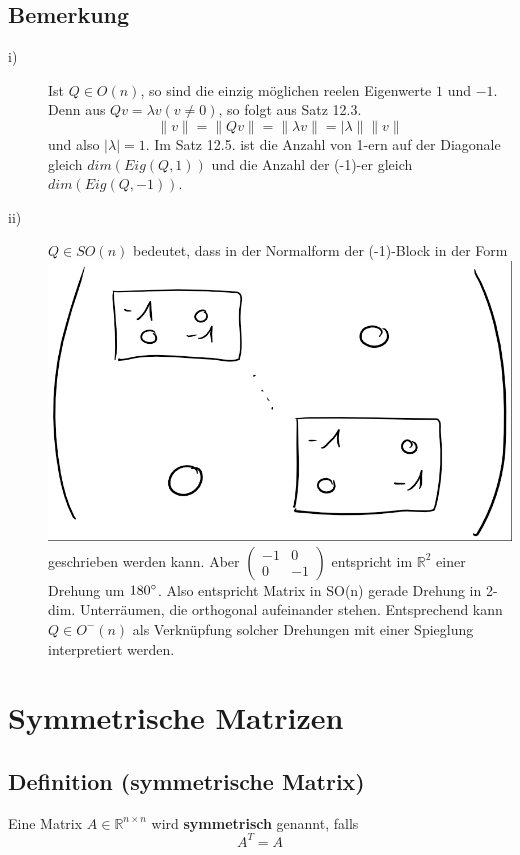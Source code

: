 \documentclass{scrbook}
\begin{document}
\section{Bemerkung}
\begin{description}
\item[i)]Ist $Q \in O(n)$, so sind die einzig möglichen reelen Eigenwerte $1$ und $-1$. Denn aus $Qv = \lambda v (v\neq 0)$, so folgt aus Satz 12.3.
\[\|v\|= \|Qv\| = \|\lambda v\| = |\lambda\| \|v\|\] und also $|\lambda|=1$. Im Satz 12.5. ist die Anzahl von 1-ern auf der Diagonale gleich $dim(Eig(Q,1))$ und die Anzahl der (-1)-er gleich $dim(Eig(Q,-1))$.
\item[ii)]$Q\in SO(n) $ bedeutet, dass in der Normalform der (-1)-Block in der Form
\\\includegraphics{Bemerkung_12_6_1.png}\\
geschrieben werden kann. Aber $\left(
\begin{array}{cc}
-1&0\\
0&-1
\end{array}
\right)$ entspricht im $\mathbb{R}^2$ einer Drehung um $180 \degree$. Also entspricht Matrix in SO(n) gerade Drehung in 2-dim. Unterräumen, die orthogonal aufeinander stehen.
Entsprechend kann $Q\in O^-(n)$ als Verknüpfung solcher Drehungen mit einer Spieglung interpretiert werden.
\end{description}
\chapter{Symmetrische Matrizen}
\section{Definition (symmetrische Matrix)}
Eine Matrix $A \in \mathbb{R}^{n\times n}$ wird \textbf{symmetrisch} genannt, falls \[A^T = A\]
\end{document}
